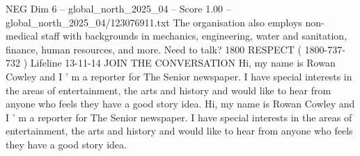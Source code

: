 \begin{textsample}{NEG Dim 6 – global\_north\_2025\_04 – Score 1.00 – global\_north\_2025\_04/123076911.txt}
The organisation also employs non-medical staff with backgrounds in mechanics, engineering, water and sanitation, finance, human resources, and more.
Need to talk? 1800 RESPECT ( 1800-737-732 ) Lifeline 13-11-14 JOIN THE CONVERSATION Hi, my name is Rowan Cowley and I ' m a reporter for The Senior newspaper.
I have special interests in the areas of entertainment, the arts and history and would like to hear from anyone who feels they have a good story idea.
Hi, my name is Rowan Cowley and I ' m a reporter for The Senior newspaper.
I have special interests in the areas of entertainment, the arts and history and would like to hear from anyone who feels they have a good story idea.

\end{textsample}
